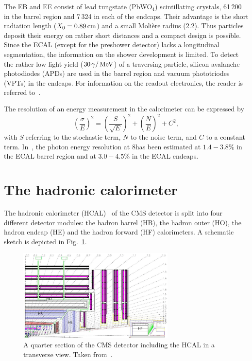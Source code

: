 The EB and EE consist of lead tungstate (PbWO$_4$) scintillating crystals, 61\,200 in the barrel region and 7\,324 in each of the endcaps. 
Their advantage is the short radiation length ($X_0=0.89\,\text{cm}$) and a small Moli\`ere radius (2.2\cm).
Thus particles deposit their energy on rather short distances and a compact design is possible.
Since the ECAL (except for the preshower detector) lacks a longitudinal segmentation, the information on the shower development is limited.
To detect the rather low light yield ($30\,\gamma/\,\text{Me}\kern-0.06667em\text{V}$) of a traversing particle, silicon avalanche photodiodes (APDs) are used in the barrel region and vacuum  phototriodes (VPTs) in the endcaps.
For information on the readout electronics, the reader is referred to~\cite{bib:CMS:TDR_2006}.

The resolution of an energy measurement in the calorimeter can be expressed by 
\begin{equation}
\label{eq:CaloResolution}
\left( \frac{\sigma}{E} \right)^2 = \left( \frac{S}{\sqrt{E}} \right)^2 + \left( \frac{N}{E} \right)^2 +C^2,
\end{equation}
with $S$ referring to the stochastic term, $N$ to the noise term, and $C$ to a constant term.
In~\cite{bib:CMS:PhotonIdentification_8TeV}, the photon energy resolution at 8\tev has been estimated at $1.4-3.8\%$ in the ECAL barrel region and at $3.0-4.5\%$ in the ECAL endcaps.


\section{The hadronic calorimeter}
The hadronic calorimeter (HCAL)~\cite{bib:CMS:TDR_2006,bib:CMS:TDR_HCAL} of the CMS detector is split into four different detector modules: the hadron barrel (HB), the hadron outer (HO), the hadron endcap (HE) and the hadron forward (HF) calorimeters.
A schematic sketch is depicted in Fig.~\ref{fig:HCAL}.
\begin{figure}[!b]
  \centering
      \includegraphics[width=0.70\textwidth]{figures/experiment/CMS/fig_HCALdiagram_smaller_size.png}
  \caption{A quarter section of the CMS detector including the HCAL in a transverse view. Taken from~\cite{bib:CMS:experiment}.}  
  \label{fig:HCAL}
\end{figure}

